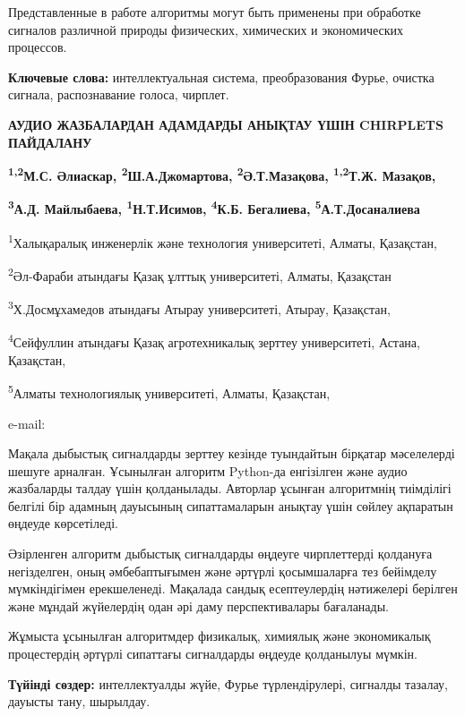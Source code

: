 Представленные в работе алгоритмы могут быть применены при обработке
сигналов различной природы физических, химических и экономических
процессов.

{\bfseries Ключевые слова:} интеллектуальная система, преобразования Фурье,
очистка сигнала, распознавание голоса, чирплет.

{\bfseries АУДИО ЖАЗБАЛАРДАН АДАМДАРДЫ АНЫҚТАУ ҮШІН CHIRPLETS ПАЙДАЛАНУ}

{\bfseries \textsuperscript{1,2}М.С. Әлиаскар,
\textsuperscript{2}Ш.А.Джомартова\textsuperscript{\envelope },
\textsuperscript{2}Ә.Т.Мазақова, \textsuperscript{1,2}Т.Ж. Мазақов,}

{\bfseries \textsuperscript{3}А.Д. Майлыбаева,
\textsuperscript{1}Н.Т.Исимов, \textsuperscript{4}К.Б. Бегалиева,
\textsuperscript{5}А.Т.Досаналиева}

\textsuperscript{1}Халықаралық инженерлік және технология университеті,
Алматы, Қазақстан,

\textsuperscript{2}Әл-Фараби атындағы Қазақ ұлттық университеті, Алматы,
Қазақстан

\textsuperscript{3}Х.Досмұхамедов атындағы Атырау университеті, Атырау,
Қазақстан,

\textsuperscript{4}Сейфуллин атындағы Қазақ агротехникалық зерттеу
университеті, Астана, Қазақстан,

\textsuperscript{5}Алматы технологиялық университеті, Алматы, Қазақстан,

e-mail: \href{mailto:jomartova@mail.ru}{}

Мақала дыбыстық сигналдарды зерттеу кезінде туындайтын бірқатар
мәселелерді шешуге арналған. Ұсынылған алгоритм Python-да енгізілген
және аудио жазбаларды талдау үшін қолданылады. Авторлар ұсынған
алгоритмнің тиімділігі белгілі бір адамның дауысының сипаттамаларын
анықтау үшін сөйлеу ақпаратын өңдеуде көрсетіледі.

Әзірленген алгоритм дыбыстық сигналдарды өңдеуге чирплеттерді қолдануға
негізделген, оның әмбебаптығымен және әртүрлі қосымшаларға тез бейімделу
мүмкіндігімен ерекшеленеді. Мақалада сандық есептеулердің нәтижелері
берілген және мұндай жүйелердің одан әрі даму перспективалары
бағаланады.

Жұмыста ұсынылған алгоритмдер физикалық, химиялық және экономикалық
процестердің әртүрлі сипаттағы сигналдарды өңдеуде қолданылуы мүмкін.

{\bfseries Түйінді сөздер:} интеллектуалды жүйе, Фурье түрлендірулері,
сигналды тазалау, дауысты тану, шырылдау.

